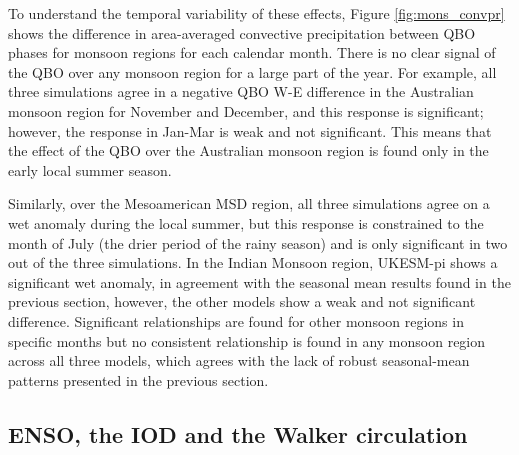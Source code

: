 To understand the temporal variability of these effects, Figure \ref{fig:mons_convpr} shows the difference in area-averaged convective precipitation between QBO phases for monsoon regions for each calendar month. There is no clear signal of the QBO over any monsoon region for a large part of the year. For example, all three simulations agree in a negative QBO W-E difference in the Australian monsoon region for November and December, and this response is significant; however, the response in Jan-Mar is weak and not significant. This means that the effect of the QBO over the Australian monsoon region is found only in the early local summer season.

 Similarly, over the Mesoamerican MSD region, all three simulations agree on a wet anomaly during the local summer, but this response is constrained to the month of July (the drier period of the rainy season) and is only significant in two out of the three simulations. 
 In the Indian Monsoon region, UKESM-pi shows a significant wet anomaly, in agreement with the seasonal mean results found in the previous section, however, the other models show a weak and not significant difference. 
Significant relationships are found for other monsoon regions in specific months but no consistent relationship is found in any monsoon region across all three models, which agrees with the lack of robust seasonal-mean patterns presented in the previous section. 





\subsection{ENSO, the IOD and the Walker circulation}

